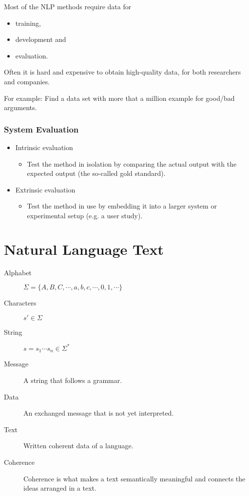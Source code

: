             Most of the NLP methods require data for
            \begin{itemize}
            	\item training,
            	\item development and
            	\item evaluation.
            \end{itemize}
        	Often it is hard and expensive to obtain high-quality data, for both researchers and companies.
        	
        	For example: Find a data set with more that a million example for good/bad arguments.

        \subsection{System Evaluation} %
            \begin{itemize}
            	\item Intrinsic evaluation
            		\begin{itemize}
            			\item Test the method in isolation by comparing the actual output with the expected output (the so-called gold standard).
            		\end{itemize}
            	\item Extrinsic evaluation
            		\begin{itemize}
            			\item Test the method in use by embedding it into a larger system or experimental setup (e.g. a user study).
            		\end{itemize}
            \end{itemize}

\chapter{Natural Language Text} %
    \begin{description}
    	\item[Alphabet] \( \Sigma = \{ A, B, C, \cdots, a, b, c, \cdots, 0, 1, \cdots \} \)
    	\item[Characters] \( s'\in \Sigma \)
    	\item[String] \( s = s_1 \cdots s_n \in \Sigma^* \)
    	\item[Message] A string that follows a grammar.
    	\item[Data] An exchanged message that is not yet interpreted.
    	\item[Text] Written coherent data of a language.
    	\item[Coherence] Coherence is what makes a text semantically meaningful and connects the ideas arranged in a text.
    \end{description}


